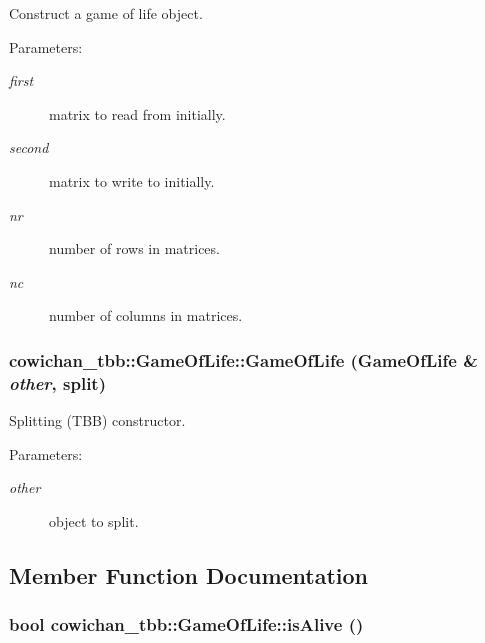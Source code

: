 Construct a game of life object. \begin{Desc}
\item[Parameters:]
\begin{description}
\item[{\em first}]matrix to read from initially. \item[{\em second}]matrix to write to initially. \item[{\em nr}]number of rows in matrices. \item[{\em nc}]number of columns in matrices. \end{description}
\end{Desc}
\hypertarget{classcowichan__tbb_1_1_game_of_life_074fbeb388fc5d5f5a33d25e0bfe1845}{
\subsubsection[{GameOfLife}]{\setlength{\rightskip}{0pt plus 5cm}cowichan\_\-tbb::GameOfLife::GameOfLife ({\bf GameOfLife} \& {\em other}, \/  split)}}
\label{classcowichan__tbb_1_1_game_of_life_074fbeb388fc5d5f5a33d25e0bfe1845}


Splitting (TBB) constructor. \begin{Desc}
\item[Parameters:]
\begin{description}
\item[{\em other}]object to split. \end{description}
\end{Desc}


\subsection{Member Function Documentation}
\hypertarget{classcowichan__tbb_1_1_game_of_life_38dced5f2712fe6c42c1299084461f0d}{
\subsubsection[{isAlive}]{\setlength{\rightskip}{0pt plus 5cm}bool cowichan\_\-tbb::GameOfLife::isAlive ()}}
\label{classcowichan__tbb_1_1_game_of_life_38dced5f2712fe6c42c1299084461f0d}


